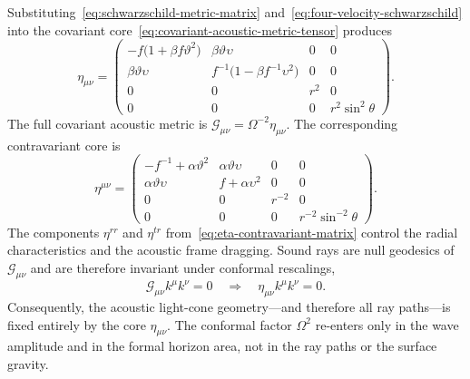 \documentclass[12pt,a4paper,preprint]{elsarticle}
\begin{document}
            Substituting~\eqref{eq:schwarzschild-metric-matrix} and~\eqref{eq:four-velocity-schwarzschild} into the covariant core~\eqref{eq:covariant-acoustic-metric-tensor} produces
            \begin{equation}
                \eta_{\mu\nu} =
                \begin{pmatrix}
                    -f\bigl(1+\beta f\vartheta^{2}\bigr) &
                    \beta\vartheta\upsilon & 0 & 0 \\
                    \beta\vartheta\upsilon &
                    f^{-1}\bigl(1-\beta f^{-1}\upsilon^{2}\bigr) & 0 & 0 \\
                    0 & 0 & r^{2} & 0 \\
                    0 & 0 & 0 & r^{2}\sin^{2}\theta
                \end{pmatrix} .
                \label{eq:eta-covariant-matrix}
            \end{equation}
            The full covariant acoustic metric is $\mathcal{G}_{\mu\nu}=\Omega^{-2}\eta_{\mu\nu}$. The corresponding contravariant core is
            \begin{equation}
                \eta^{\mu\nu} =
                \begin{pmatrix}
                    -f^{-1}+\alpha\vartheta^{2} &
                    \alpha\vartheta\upsilon & 0 & 0 \\
                    \alpha\vartheta\upsilon &
                    f+\alpha\upsilon^{2} & 0 & 0 \\
                    0 & 0 & r^{-2} & 0 \\
                    0 & 0 & 0 & r^{-2}\sin^{-2}\theta
                \end{pmatrix} .
                \label{eq:eta-contravariant-matrix}
            \end{equation}
            The components $\eta^{rr}$ and $\eta^{tr}$ from~\eqref{eq:eta-contravariant-matrix} control the radial characteristics and the acoustic frame dragging. Sound rays are null geodesics of $\mathcal{G}_{\mu\nu}$ and are therefore invariant under conformal rescalings,
            \begin{equation}
                \mathcal{G}_{\mu\nu}k^{\mu}k^{\nu}=0 \quad\Longrightarrow\quad \eta_{\mu\nu}k^{\mu}k^{\nu} = 0 .
                \label{eq:acoustic-null-condition}
            \end{equation}
            Consequently, the acoustic light-cone geometry---and therefore all ray paths---is fixed entirely by the core $\eta_{\mu\nu}$. The conformal factor $\Omega^{2}$ re-enters only in the wave amplitude and in the formal horizon area, not in the ray paths or the surface gravity.
\end{document}
